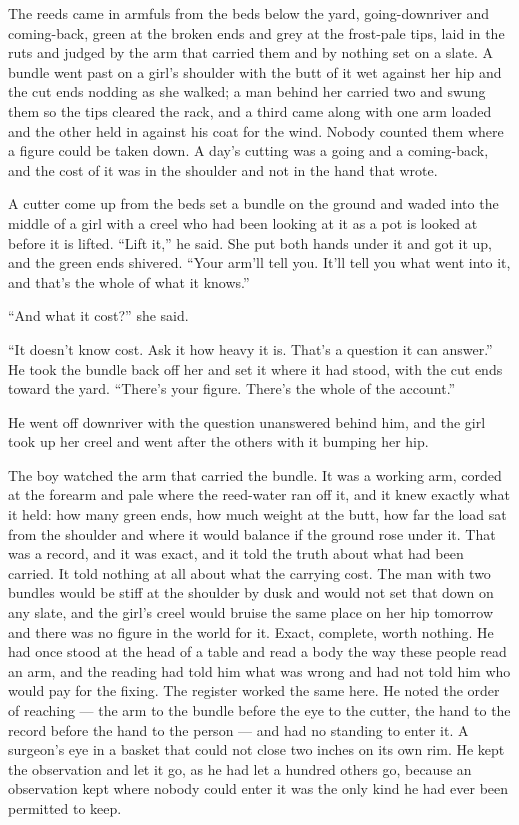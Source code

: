 \scenebreak

The reeds came in armfuls from the beds below the yard, going-downriver and coming-back, green at the broken ends and grey at the frost-pale tips, laid in the ruts and judged by the arm that carried them and by nothing set on a slate. A bundle went past on a girl's shoulder with the butt of it wet against her hip and the cut ends nodding as she walked; a man behind her carried two and swung them so the tips cleared the rack, and a third came along with one arm loaded and the other held in against his coat for the wind. Nobody counted them where a figure could be taken down. A day's cutting was a going and a coming-back, and the cost of it was in the shoulder and not in the hand that wrote.

A cutter come up from the beds set a bundle on the ground and waded into the middle of a girl with a creel who had been looking at it as a pot is looked at before it is lifted. “Lift it,” he said. She put both hands under it and got it up, and the green ends shivered. “Your arm'll tell you. It'll tell you what went into it, and that's the whole of what it knows.”

“And what it cost?” she said.

“It doesn't know cost. Ask it how heavy it is. That's a question it can answer.” He took the bundle back off her and set it where it had stood, with the cut ends toward the yard. “There's your figure. There's the whole of the account.”

He went off downriver with the question unanswered behind him, and the girl took up her creel and went after the others with it bumping her hip.

The boy watched the arm that carried the bundle. It was a working arm, corded at the forearm and pale where the reed-water ran off it, and it knew exactly what it held: how many green ends, how much weight at the butt, how far the load sat from the shoulder and where it would balance if the ground rose under it. That was a record, and it was exact, and it told the truth about what had been carried. It told nothing at all about what the carrying cost. The man with two bundles would be stiff at the shoulder by dusk and would not set that down on any slate, and the girl's creel would bruise the same place on her hip tomorrow and there was no figure in the world for it. Exact, complete, worth nothing. He had once stood at the head of a table and read a body the way these people read an arm, and the reading had told him what was wrong and had not told him who would pay for the fixing. The register worked the same here. He noted the order of reaching --- the arm to the bundle before the eye to the cutter, the hand to the record before the hand to the person --- and had no standing to enter it. A surgeon's eye in a basket that could not close two inches on its own rim. He kept the observation and let it go, as he had let a hundred others go, because an observation kept where nobody could enter it was the only kind he had ever been permitted to keep.

